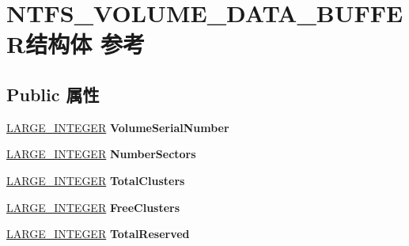 \hypertarget{struct_n_t_f_s___v_o_l_u_m_e___d_a_t_a___b_u_f_f_e_r}{}\section{N\+T\+F\+S\+\_\+\+V\+O\+L\+U\+M\+E\+\_\+\+D\+A\+T\+A\+\_\+\+B\+U\+F\+F\+E\+R结构体 参考}
\label{struct_n_t_f_s___v_o_l_u_m_e___d_a_t_a___b_u_f_f_e_r}
\subsection*{Public 属性}
\begin{DoxyCompactItemize}
\item 
\mbox{\label{struct_n_t_f_s___v_o_l_u_m_e___d_a_t_a___b_u_f_f_e_r_ab08073b59487b834f1de5c76a0c9cfbd}} 
\hyperlink{union___l_a_r_g_e___i_n_t_e_g_e_r}{L\+A\+R\+G\+E\+\_\+\+I\+N\+T\+E\+G\+ER} {\bfseries Volume\+Serial\+Number}
\item 
\mbox{\label{struct_n_t_f_s___v_o_l_u_m_e___d_a_t_a___b_u_f_f_e_r_a0aba2f738395fd34fa6f09b8ec2484bb}} 
\hyperlink{union___l_a_r_g_e___i_n_t_e_g_e_r}{L\+A\+R\+G\+E\+\_\+\+I\+N\+T\+E\+G\+ER} {\bfseries Number\+Sectors}
\item 
\mbox{\label{struct_n_t_f_s___v_o_l_u_m_e___d_a_t_a___b_u_f_f_e_r_aae3c4b5fec02dada7811e41c05d78cbf}} 
\hyperlink{union___l_a_r_g_e___i_n_t_e_g_e_r}{L\+A\+R\+G\+E\+\_\+\+I\+N\+T\+E\+G\+ER} {\bfseries Total\+Clusters}
\item 
\mbox{\label{struct_n_t_f_s___v_o_l_u_m_e___d_a_t_a___b_u_f_f_e_r_a868363a6e2a11dd43bf86b144e328370}} 
\hyperlink{union___l_a_r_g_e___i_n_t_e_g_e_r}{L\+A\+R\+G\+E\+\_\+\+I\+N\+T\+E\+G\+ER} {\bfseries Free\+Clusters}
\item 
\mbox{\label{struct_n_t_f_s___v_o_l_u_m_e___d_a_t_a___b_u_f_f_e_r_a2e80ab1c062328092cc3d64ca053154f}} 
\hyperlink{union___l_a_r_g_e___i_n_t_e_g_e_r}{L\+A\+R\+G\+E\+\_\+\+I\+N\+T\+E\+G\+ER} {\bfseries Total\+Reserved}

\end{DoxyCompactItemize}
